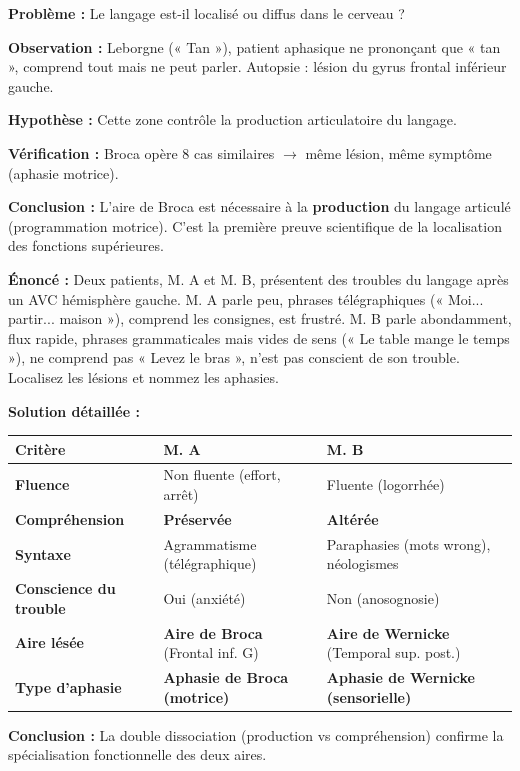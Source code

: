 \documentclass[11pt]{article}
\begin{document}
\begin{experience}
\textbf{Problème :} Le langage est-il localisé ou diffus dans le cerveau ?\par
\textbf{Observation :} Leborgne (« Tan »), patient aphasique ne prononçant que « tan », comprend tout mais ne peut parler. Autopsie : lésion du gyrus frontal inférieur gauche.\par
\textbf{Hypothèse :} Cette zone contrôle la production articulatoire du langage.\par
\textbf{Vérification :} Broca opère 8 cas similaires $\to$ même lésion, même symptôme (aphasie motrice).\par
\textbf{Conclusion :} L'aire de Broca est nécessaire à la \textbf{production} du langage articulé (programmation motrice). C'est la première preuve scientifique de la localisation des fonctions supérieures.
\end{experience}

\begin{exoresolu}
\textbf{Énoncé :} Deux patients, M. A et M. B, présentent des troubles du langage après un AVC hémisphère gauche. M. A parle peu, phrases télégraphiques (« Moi... partir... maison »), comprend les consignes, est frustré. M. B parle abondamment, flux rapide, phrases grammaticales mais vides de sens (« Le table mange le temps »), ne comprend pas « Levez le bras », n'est pas conscient de son trouble. Localisez les lésions et nommez les aphasies.\par
\tcblower
\textbf{Solution détaillée :}
\begin{center}
\begin{tabularx}{\linewidth}{|l|X|X|}\hline
\textbf{Critère} & \textbf{M. A} & \textbf{M. B} \\ \hline
\textbf{Fluence} & Non fluente (effort, arrêt) & Fluente (logorrhée) \\ \hline
\textbf{Compréhension} & \textbf{Préservée} & \textbf{Altérée} \\ \hline
\textbf{Syntaxe} & Agrammatisme (télégraphique) & Paraphasies (mots wrong), néologismes \\ \hline
\textbf{Conscience du trouble} & Oui (anxiété) & Non (anosognosie) \\ \hline
\textbf{Aire lésée} & \textbf{Aire de Broca} (Frontal inf. G) & \textbf{Aire de Wernicke} (Temporal sup. post.) \\ \hline
\textbf{Type d'aphasie} & \textbf{Aphasie de Broca (motrice)} & \textbf{Aphasie de Wernicke (sensorielle)} \\ \hline
\end{tabularx}
\end{center}
\textbf{Conclusion :} La double dissociation (production vs compréhension) confirme la spécialisation fonctionnelle des deux aires.
\end{exoresolu}
\end{document}
